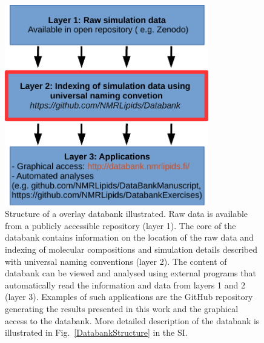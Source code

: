 \documentclass[fleqn,10pt]{wlscirep}
\begin{document}
 
\begin{figure}
    \centering
    \includegraphics[width = 89mm]{Figures/overlay.pdf}
    \caption{Structure of a overlay databank illustrated. 
    Raw data is available from a publicly accessible repository (layer 1).
    The core of the databank contains information on the location of the raw data and indexing of molecular compositions and simulation details described with universal naming conventions (layer 2).
    The content of databank can be viewed and analysed using external programs that automatically read the information and data from layers 1 and 2 (layer 3). Examples of such applications are the GitHub repository generating the results presented in this work and the graphical access to the databank.
    More detailed description of the databank is illustrated in Fig.~\ref{DatabankStructure} in the SI.
    }
    \label{fig:overlay}
\end{figure}
\end{document}
